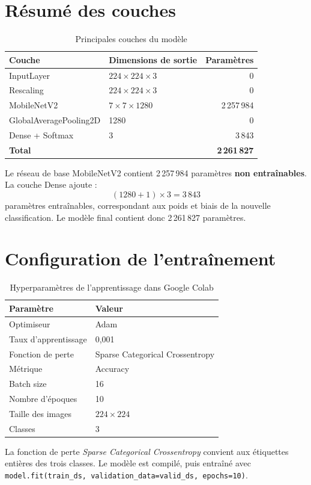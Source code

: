 \documentclass[11pt,a4paper,oneside]{report}
\begin{document}
\section{Résumé des couches}
\begin{table}[H]\centering
\caption{Principales couches du modèle}
\begin{tabularx}{\textwidth}{lXr}
\toprule
\textbf{Couche}&\textbf{Dimensions de sortie}&\textbf{Paramètres}\\
\midrule
InputLayer&$224\times224\times3$&0\\
Rescaling&$224\times224\times3$&0\\
MobileNetV2&$7\times7\times1280$&2\,257\,984\\
GlobalAveragePooling2D&1280&0\\
Dense + Softmax&3&3\,843\\
\midrule
\textbf{Total}&&\textbf{2\,261\,827}\\
\bottomrule
\end{tabularx}
\end{table}
Le réseau de base MobileNetV2 contient 2\,257\,984 paramètres \textbf{non entraînables}. La couche Dense ajoute :
\begin{equation}
(1280+1)\times3=3\,843
\end{equation}
paramètres entraînables, correspondant aux poids et biais de la nouvelle classification. Le modèle final contient donc 2\,261\,827 paramètres.
\section{Configuration de l'entraînement}
\begin{table}[H]\centering
\caption{Hyperparamètres de l'apprentissage dans Google Colab}
\begin{tabular}{ll}
\toprule
\textbf{Paramètre}&\textbf{Valeur}\\
\midrule
Optimiseur&Adam\\
Taux d'apprentissage&0,001\\
Fonction de perte&Sparse Categorical Crossentropy\\
Métrique&Accuracy\\
Batch size&16\\
Nombre d'époques&10\\
Taille des images&$224\times224$\\
Classes&3\\
\bottomrule
\end{tabular}
\end{table}
La fonction de perte \emph{Sparse Categorical Crossentropy} convient aux étiquettes entières des trois classes. Le modèle est compilé, puis entraîné avec \texttt{model.fit(train\_ds, validation\_data=valid\_ds, epochs=10)}.
\end{document}

